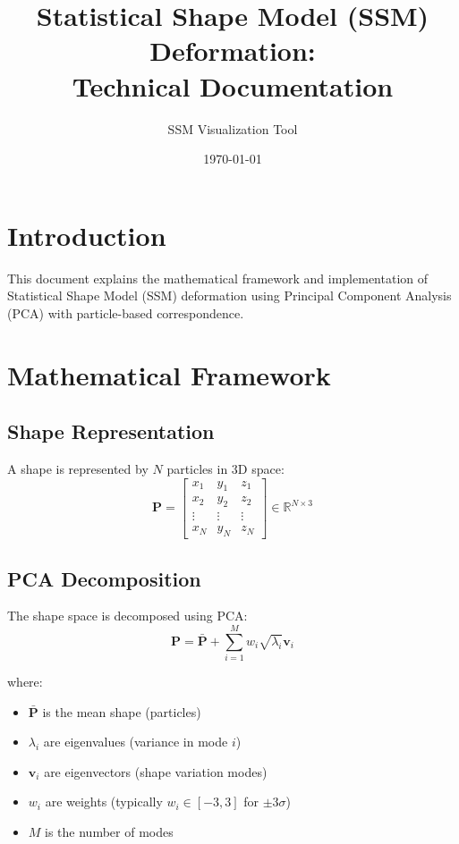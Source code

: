 \documentclass[12pt,a4paper]{article}
\title{Statistical Shape Model (SSM) Deformation: \\
Technical Documentation}
\author{SSM Visualization Tool}
\date{\today}
\begin{document}
\maketitle

\section{Introduction}

This document explains the mathematical framework and implementation of Statistical Shape Model (SSM) deformation using Principal Component Analysis (PCA) with particle-based correspondence.

\section{Mathematical Framework}

\subsection{Shape Representation}

A shape is represented by $N$ particles in 3D space:
\begin{equation}
\mathbf{P} = \begin{bmatrix}
x_1 & y_1 & z_1 \\
x_2 & y_2 & z_2 \\
\vdots & \vdots & \vdots \\
x_N & y_N & z_N
\end{bmatrix} \in \mathbb{R}^{N \times 3}
\end{equation}

\subsection{PCA Decomposition}

The shape space is decomposed using PCA:
\begin{equation}
\mathbf{P} = \bar{\mathbf{P}} + \sum_{i=1}^{M} w_i \sqrt{\lambda_i} \mathbf{v}_i
\end{equation}

where:
\begin{itemize}
    \item $\bar{\mathbf{P}}$ is the mean shape (particles)
    \item $\lambda_i$ are eigenvalues (variance in mode $i$)
    \item $\mathbf{v}_i$ are eigenvectors (shape variation modes)
    \item $w_i$ are weights (typically $w_i \in [-3, 3]$ for $\pm 3\sigma$)
    \item $M$ is the number of modes
\end{itemize}
\end{document}
